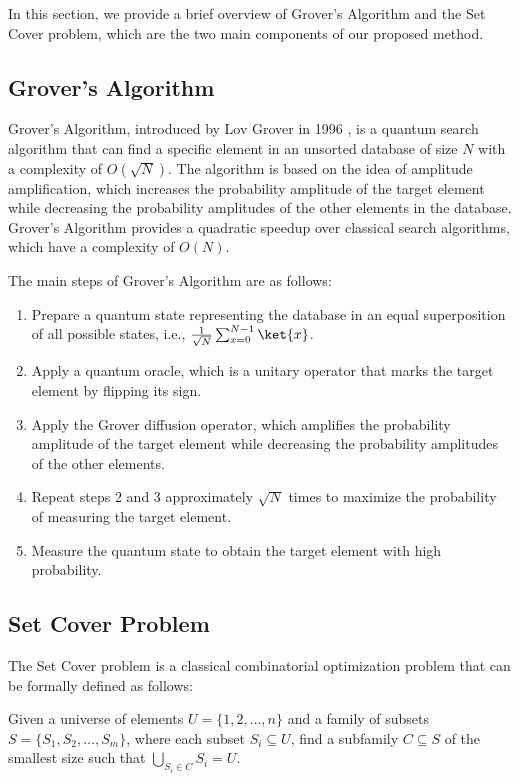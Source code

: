 In this section, we provide a brief overview of Grover's Algorithm and the Set Cover problem, which are the two main components of our proposed method.

\subsection{Grover's Algorithm}
\label{subsec:grovers_algorithm}

Grover's Algorithm, introduced by Lov Grover in 1996 \cite{Grover1996}, is a quantum search algorithm that can find a specific element in an unsorted database of size $N$ with a complexity of $O(\sqrt{N})$. The algorithm is based on the idea of amplitude amplification, which increases the probability amplitude of the target element while decreasing the probability amplitudes of the other elements in the database. Grover's Algorithm provides a quadratic speedup over classical search algorithms, which have a complexity of $O(N)$.

The main steps of Grover's Algorithm are as follows:

\begin{enumerate}
    \item Prepare a quantum state representing the database in an equal superposition of all possible states, i.e., $\frac{1}{\sqrt{N}}\sum_{x=0}^{N-1}\ket{x}$.
    \item Apply a quantum oracle, which is a unitary operator that marks the target element by flipping its sign.
    \item Apply the Grover diffusion operator, which amplifies the probability amplitude of the target element while decreasing the probability amplitudes of the other elements.
    \item Repeat steps 2 and 3 approximately $\sqrt{N}$ times to maximize the probability of measuring the target element.
    \item Measure the quantum state to obtain the target element with high probability.
\end{enumerate}

\subsection{Set Cover Problem}
\label{subsec:set_cover_problem}

The Set Cover problem is a classical combinatorial optimization problem that can be formally defined as follows:

\begin{definition}
Given a universe of elements $U = \{1, 2, \ldots, n\}$ and a family of subsets $S = \{S_1, S_2, \ldots, S_m\}$, where each subset $S_i \subseteq U$, find a subfamily $C \subseteq S$ of the smallest size such that $\bigcup_{S_i \in C} S_i = U$.
\end{definition}

